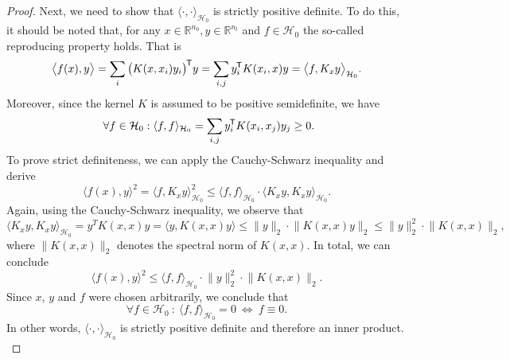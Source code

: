 \documentclass[11pt, a4paper]{article}
\newcommand{\R}{\mathbb{R}}
\renewcommand{\H}{\mathcal{H}}
\newcommand*{\tr}{^{\mkern-1.5mu\mathsf{T}}}
\begin{document}
\begin{proof}
Next, we need to show that $\langle \cdot, \cdot \rangle_{\H_0}$ is strictly positive definite. To do this, it should be noted that, for any $x \in \R^{n_0}, y \in \R^{n_l}$ and $f \in \H_0$ the so-called reproducing property holds. That is
\[ \big \langle f(x), y \big \rangle = \sum_{i} \big ( K(x,x_i)y_i \big ) \tr y = \sum_{i,j} y_i \tr K(x_i,x)y = \big \langle f, K_xy \big \rangle_{\H_0}. \]
Moreover, since the kernel $K$ is assumed to be positive semidefinite, we have
\[ \forall f \in \H_0 : \langle f,f \rangle_{\H_0} = \sum_{i,j} y_i \tr K(x_i, x_j) y_j \geq 0. \]
To prove strict definiteness, we can apply the Cauchy-Schwarz inequality and derive
\[ \big \langle f(x), y \big \rangle^2 = \big \langle f, K_xy \big \rangle_{\H_0}^2 \leq \big \langle f , f \big \rangle_{\H_0} \cdot \big \langle K_xy , K_xy \big \rangle_{\H_0}. \]
Again, using the Cauchy-Schwarz inequality, we observe that 
\[ \big \langle K_xy, K_xy \big \rangle_{\H_0} = y^TK(x,x)y = \big \langle y, K(x,x)y \big \rangle \leq \big \| y \big \|_2 \cdot \big \| K(x,x)y \big \|_2 \leq \big \| y \big \|_2^2 \cdot \big \| K(x,x) \big \|_2, \]
where $\big \| K(x,x) \big \|_2$ denotes the spectral norm of $K(x,x)$. In total, we can conclude
\[ \big \langle f(x), y \big \rangle^2 \leq \big \langle f , f \big \rangle_{\H_0} \cdot \big \| y \big \|_2^2 \cdot \big \| K(x,x) \big \|_2. \]
Since $x$, $y$ and $f$ were chosen arbitrarily, we conclude that 
\[ \forall f \in \H_0 \ : \ \langle f , f \rangle_{\H_0} = 0 \ \Leftrightarrow \ f \equiv 0. \]
In other words, $\langle \cdot, \cdot \rangle_{\H_0}$ is strictly positive definite and therefore an inner product. \\


\end{proof}
\end{document}
